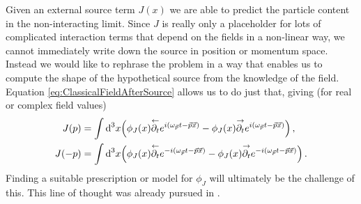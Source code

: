 Given an external source term $J(x)$ we are able to predict the particle content in the non-interacting limit. Since $J$ is really only a placeholder for lots of complicated interaction terms that depend on the fields in a non-linear way, we cannot immediately write down the source in position or momentum space. Instead we would like to rephrase the problem in a way that enables us to compute the shape of the hypothetical source from the knowledge of the field. Equation \eqref{eq:ClassicalFieldAfterSource} allows us to do just that, giving (for real or complex field values)
\begin{subequations}
    \begin{align}        
        J(p)&=\int\text{d}^3x\Big(\phi_J(x)\overset{\leftarrow}{\partial_t}e^{{i}(\omega_{\vec{p}}t-\vec{p}\vec{x})}-\phi_J(x)\overset{\rightarrow}{\partial_t}e^{{i}(\omega_{\vec{p}}t-\vec{p}\vec{x})}\Big)\,,\\
        J(-p)&=\int\text{d}^3x\Big(\phi_J(x)\overset{\leftarrow}{\partial_t}e^{-{i}(\omega_{\vec{p}}t-\vec{p}\vec{x})}-\phi_J(x)\overset{\rightarrow}{\partial_t}e^{-{i}(\omega_{\vec{p}}t-\vec{p}\vec{x})}\Big)\,.
    \end{align}
    \label{eq:SourceFieldRelation}
\end{subequations} 
Finding a suitable prescription or model for $\phi_J$ will ultimately be the challenge of this. This line of thought was already pursued in \cite{Amelino-CameliaEtAl_1997}.